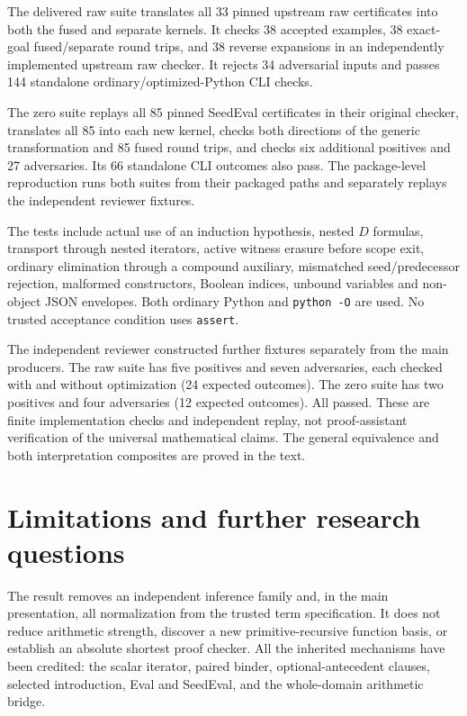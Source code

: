 \documentclass[11pt,letterpaper]{article}
\theoremstyle{definition}\newtheorem{definition}[theorem]{Definition}
\theoremstyle{remark}\newtheorem{remark}[theorem]{Remark}
\begin{document}
The delivered raw suite translates all 33 pinned upstream raw certificates
into both the fused and separate kernels. It checks 38 accepted examples,
38 exact-goal fused/separate round trips, and 38 reverse expansions in an
independently implemented upstream raw checker. It rejects 34 adversarial
inputs and passes 144 standalone ordinary/optimized-Python CLI checks.

The zero suite replays all 85 pinned SeedEval certificates in their original
checker, translates all 85 into each new kernel, checks both directions
of the generic transformation and 85 fused round trips, and checks six
additional positives and 27 adversaries. Its 66 standalone CLI outcomes
also pass. The package-level reproduction runs both suites from their
packaged paths and separately replays the independent reviewer fixtures.


The tests include actual use of an induction hypothesis, nested $D$
formulas, transport through nested iterators, active witness erasure before
scope exit, ordinary elimination through a compound auxiliary, mismatched
seed/predecessor rejection, malformed constructors, Boolean indices,
unbound variables and non-object JSON envelopes. Both ordinary Python and
\texttt{python -O} are used. No trusted acceptance condition uses
\texttt{assert}.

The independent reviewer constructed further fixtures separately from the
main producers. The raw suite has five positives and seven adversaries,
each checked with and without optimization (24 expected outcomes). The
zero suite has two positives and four adversaries (12 expected outcomes).
All passed. These are finite implementation checks and independent replay,
not proof-assistant verification of the universal mathematical claims.
The general equivalence and both interpretation composites are proved
in the text.

\section{Limitations and further research questions}
\label{sec:questions}

The result removes an independent inference family and, in the main
presentation, all normalization from the trusted term specification. It
does not reduce arithmetic strength, discover a new primitive-recursive
function basis, or establish an absolute shortest proof checker. All the
inherited mechanisms have been credited: the scalar iterator, paired
binder, optional-antecedent clauses, selected introduction, Eval and
SeedEval, and the whole-domain arithmetic bridge.
\end{document}
